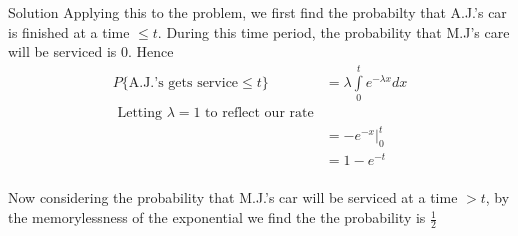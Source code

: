 \documentclass{article}
\begin{document}
\begin{spacing}{1.1}
\begin{homeworkProblem}
\begin{enumerate}[(a)]
\begin{homeworkSection}{Solution}
        Applying this to the problem, we first find the probabilty that
        A.J.'s car is finished at a time $\le t$.  During this time period, 
        the probability that M.J's care will be serviced is $0$.  Hence
          \begin{align*}
            P\{ \text{A.J.'s gets service} \le t\} &= \lambda \int\limits_0^t e^{-\lambda x} dx\\
            \text{ Letting $\lambda = 1$ to reflect our rate}\\
            &= \left. -e^{-x} \right|_0^t\\
            &= 1 - e^{-t}\\
          \end{align*}

        Now considering the probability that M.J.'s car will be serviced at a time $> t$,
        by the memorylessness of the exponential we find the the probability is $\frac{ 1}{2}$


\end{homeworkSection}
\end{enumerate}
\end{homeworkProblem}
\end{spacing}
\end{document}
